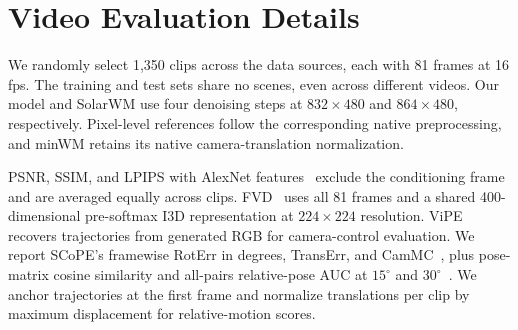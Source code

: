 
\section{Video Evaluation Details}
\label{sec:supp_video_evaluation}

We randomly select 1,350 clips across the data sources, each with 81 frames at 16\,fps.
The training and test sets share no scenes, even across different videos.
Our model and SolarWM use four denoising steps at $832\!\times\!480$ and $864\!\times\!480$, respectively.
Pixel-level references follow the corresponding native preprocessing, and minWM retains its native camera-translation normalization.

PSNR, SSIM, and LPIPS with AlexNet features~\cite{zhang2018lpips} exclude the conditioning frame and are averaged equally across clips.
FVD~\cite{unterthiner2018fvd} uses all 81 frames and a shared 400-dimensional pre-softmax I3D representation at $224\!\times\!224$ resolution.
ViPE~\cite{huang2025vipevideoposeengine} recovers trajectories from generated RGB for camera-control evaluation.
We report SCoPE's framewise RotErr in degrees, TransErr, and CamMC~\cite{yin2026scope}, plus pose-matrix cosine similarity and all-pairs relative-pose AUC at $15^\circ$ and $30^\circ$~\cite{wang2025vggt}.
We anchor trajectories at the first frame and normalize translations per clip by maximum displacement for relative-motion scores.
